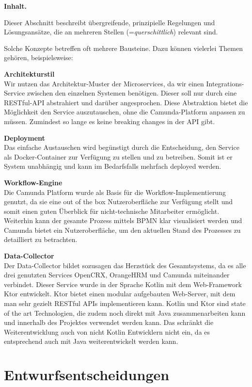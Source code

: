 \documentclass[]{article}
\begin{document}
\textbf{Inhalt.}

Dieser Abschnitt beschreibt übergreifende, prinzipielle Regelungen und
Lösungsansätze, die an mehreren Stellen (=\emph{querschittlich})
relevant sind.

Solche Konzepte betreffen oft mehrere Bausteine. Dazu können vielerlei
Themen gehören, beispielsweise:

\textbf{Architekturstil}\\
Wir nutzen das Architektur-Muster der Microservices, da wir einen Integrations-Service zwischen den einzelnen Systemen benötigen.
Dieser soll nur durch eine RESTful-API abstrahiert und darüber angesprochen.
Diese Abstraktion bietet die Möglichkeit den Service auszutauschen, ohne die Camunda-Platform anpassen zu müssen. 
Zumindest so lange es keine breaking changes in der API gibt. 

\textbf{Deployment}\\
Das einfache Austauschen wird begünstigt durch die Entscheidung, den Service als Docker-Container zur Verfügung zu stellen und zu betreiben.
Somit ist er System unabhängig und kann im Bedarfsfalls mehrfach deployed werden.

\textbf{Workflow-Engine}\\
Die Camunda Platform wurde als Basis für die Workflow-Implementierung genutzt, da sie eine out of the box Nutzeroberfläche zur Verfügung stellt und somit einen guten Überblick für nicht-technische Mitarbeiter ermöglicht.
Weiterhin kann der gesamte Prozess mittels BPMN klar visualisiert werden und Camunda bietet ein Nutzeroberfläche, um den aktuellen Stand des Prozesses zu detailliert zu betrachten.

\textbf{Data-Collector}\\
Der Data-Collector bildet sozusagen das Herzstück des Gesamtsystems, da es alle drei genutzten Services OpenCRX, OrangeHRM und Camunda miteinander verbindet.
Dieser Service wurde in der Sprache Kotlin mit dem Web-Framework Ktor entwickelt. 
Ktor bietet einen modular aufgebauten Web-Server, mit dem man sehr gezielt RESTful APIs implementieren kann.
Kotlin und Ktor sind state of the art Technologien, die zudem noch direkt mit Java zusammenarbeiten kann und innerhalb des Projektes verwendet werden kann. 
Das schränkt die Weiterentwicklung auch von nicht Kotlin Entwicklern nicht ein, da es entsprechend auch mit Java weiterentwickelt werden kann.

\hypertarget{section-design-decisions}{%
\section{Entwurfsentscheidungen}\label{section-design-decisions}}
\end{document}
